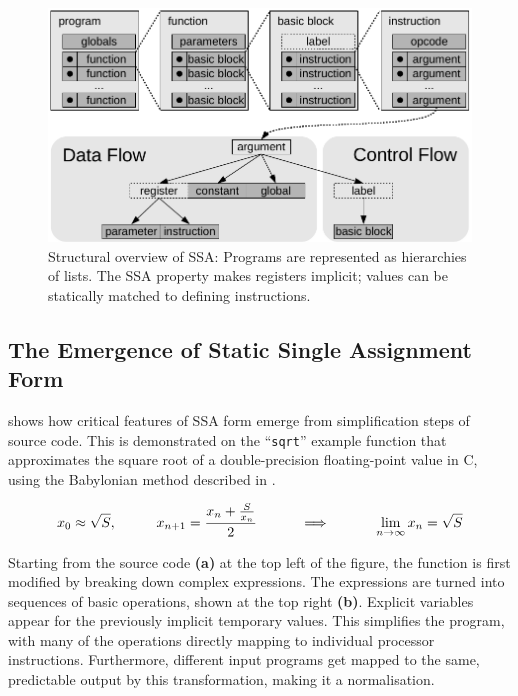 \begin{figure}[h]
\centering
\includegraphics[width=\textwidth]{figures/ssaoverview}
\caption{Structural overview of SSA: Programs are represented as hierarchies of
    lists. The SSA property makes registers implicit; values can be statically
    matched to defining instructions.}
\label{fig:ssaoverview}
\end{figure}

\subsection{The Emergence of Static Single Assignment Form}

     shows how critical features of SSA form emerge from
    simplification steps of source code.
    This is demonstrated on the ``{\tt sqrt}'' example function that
    approximates the square root of a double-precision floating-point value
    in C, using the Babylonian method described in .

\begin{equation}
    x_0\approx\sqrt{S},\text{\hspace{1cm}}
    x_{n+1}=\frac{x_n+\frac{S}{x_n}}{2}\text{\hspace{1cm}}
    \implies\text{\hspace{1cm}}
    \lim_{n\rightarrow\infty}x_n=\sqrt{S}
    \label{babylonian_equation}
\end{equation}

    Starting from the source code {\bf(a)} at the top left of the figure, the
    function is first modified by breaking down complex expressions.
    The expressions are turned into sequences of basic operations, shown at the
    top right {\bf(b)}.
    Explicit variables appear for the previously implicit temporary values.
    This simplifies the program, with many of the operations directly mapping to
    individual processor instructions.
    Furthermore, different input programs get mapped to the same,
    predictable output by this transformation, making it a normalisation.

